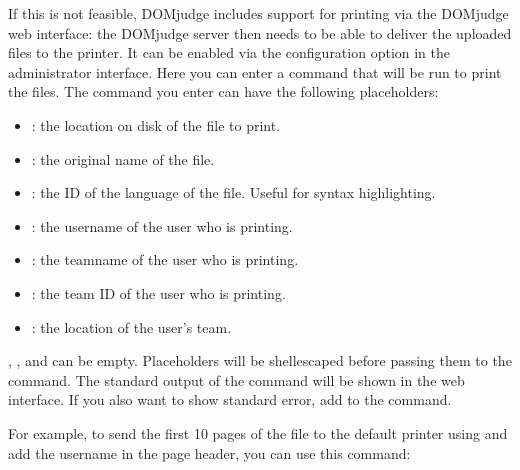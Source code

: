 \documentclass[a4paper,10pt,english,openany]{sphinxmanual}
\begin{document}
\sphinxAtStartPar
If this is not feasible, DOMjudge includes support for printing via
the DOMjudge web interface: the DOMjudge server then needs to be
able to deliver the uploaded files to the printer. It can be
enabled via the  configuration option in
the administrator interface. Here you can enter a command that will
be run to print the files. The command you enter can have the
following placeholders:
\begin{itemize}
\item {} 
\sphinxAtStartPar
\sphinxcode{\sphinxupquote{{[}file{]}}}: the location on disk of the file to print.

\item {} 
\sphinxAtStartPar
\sphinxcode{\sphinxupquote{{[}original{]}}}: the original name of the file.

\item {} 
\sphinxAtStartPar
\sphinxcode{\sphinxupquote{{[}language{]}}}: the ID of the language of the file. Useful for syntax highlighting.

\item {} 
\sphinxAtStartPar
\sphinxcode{\sphinxupquote{{[}username{]}}}: the username of the user who is printing.

\item {} 
\sphinxAtStartPar
\sphinxcode{\sphinxupquote{{[}teamname{]}}}: the teamname of the user who is printing.

\item {} 
\sphinxAtStartPar
\sphinxcode{\sphinxupquote{{[}teamid{]}}}: the team ID of the user who is printing.

\item {} 
\sphinxAtStartPar
\sphinxcode{\sphinxupquote{{[}location{]}}}: the location of the user’s team.

\end{itemize}

\sphinxAtStartPar
\sphinxcode{\sphinxupquote{{[}language{]}}}, \sphinxcode{\sphinxupquote{{[}teamname{]}}}, \sphinxcode{\sphinxupquote{{[}teamid{]}}} and
\sphinxcode{\sphinxupquote{{[}location{]}}} can be empty. Placeholders will be shell\sphinxhyphen{}escaped before
passing them to the command. The standard output of the command will
be shown in the web interface. If you also want to show standard error,
add  to the command.

\sphinxAtStartPar
For example, to send the first 10 pages of the file to the default printer
using  and add the username in the page header,
you can use this command:
\end{document}
